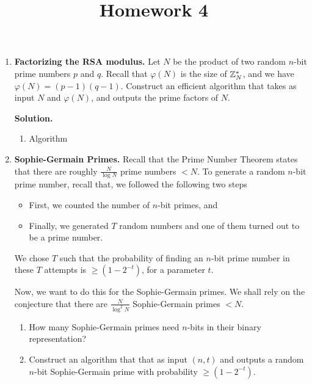 \documentclass[11pt]{article}
\newcommand{\nextoddpage}{\checkoddpage\ifoddpage{\ \newpage\ \newpage}\else{\ \newpage}\fi}
\begin{document}
\title{Homework 4}

\date{}

\maketitle 

\thispagestyle{fancy}  
\pagestyle{fancy}      




\begin{enumerate}

\item {\bfseries Factorizing the RSA modulus.} 
  Let $N$ be the product of two random $n$-bit prime numbers $p$ and $q$. 
  Recall that $\varphi(N)$ is the size of ${\mathbb Z}_N^*$, and we have $\varphi(N)=(p-1)(q-1)$. 
  Construct an efficient algorithm that takes as input $N$ and $\varphi(N)$, and outputs the prime factors of  $N$. 
  
  {\bfseries Solution.} 
  \begin{enumerate}
  \item Algorithm
  \end{enumerate}  


  
\nextoddpage 
\item {\bfseries Sophie-Germain Primes.}
  Recall that the Prime Number Theorem states that there are roughly $\frac N{\log N}$ prime numbers $<N$. 
  To generate a random $n$-bit prime number, recall that, we followed the following two steps
  \begin{itemize}
  \item First, we counted the number of $n$-bit primes, and 
  \item Finally, we generated $T$ random numbers and one of them turned out to be a prime number.
  \end{itemize}  
  We chose $T$ such that the probability of finding an $n$-bit prime number in these $T$ attempts is $\geq (1-2^{-t})$, for a parameter $t$. 
  
  Now, we want to do this for the Sophie-Germain primes. 
  We shall rely on the conjecture that there are $\frac N{\log^2 N}$ Sophie-Germain primes $<N$. 
  \begin{enumerate}
  \item How many Sophie-Germain primes need $n$-bits in their binary representation? 
  \item Construct an algorithm that that as input $(n,t)$ and outputs a random $n$-bit Sophie-Germain prime with probability $\geq (1-2^{-t})$. 
  \end{enumerate} 
  

\end{enumerate}
\end{document}
